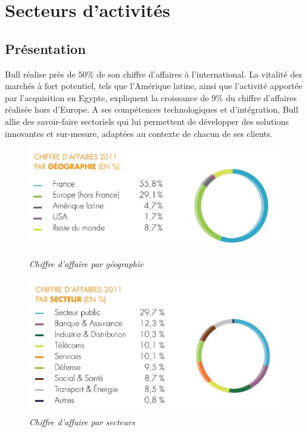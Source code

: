 \documentclass[11pt]{article}
\begin{document}
	\section{Secteurs d'activités}
		\subsection{Présentation}
		Bull réalise près de 50\% de son chiffre d'affaires à l'international. La vitalité des marchés à fort potentiel, tels 
		que l'Amérique latine, ainsi que l'activité apportée par l'acquisition en Egypte, expliquent la croissance de 9\% du chiffre 
		d'affaires réalisée hors d'Europe. \newline
		A ses compétences technologiques et d'intégration, Bull allie des savoir-faire sectoriels qui lui permettent de développer 
		des solutions innovantes et sur-mesure, adaptées au contexte de chacun de ses clients.
		\newpage
		\begin{figure}[h!]
		\begin{minipage}[b]{0.5\linewidth}
		\centering \includegraphics[scale=0.5]{profil2012_ca_repartition_fr.jpg}
		\caption{\it \small{Chiffre d'affaire par géographie}}
		\end{minipage}\hfill
		\begin{minipage}[b]{0.5\linewidth}
		\centering \includegraphics[scale=0.5]{profil2012_ca_repartitionsecteur_fr.jpg}
		\caption{\it \small{Chiffre d'affaire par secteurs}}
		\end{minipage}
		\end{figure}
\end{document}

